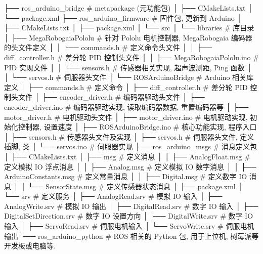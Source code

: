 \documentclass[openany, fontset=windowsold]{ctexbook}
\theoremstyle{kaiti}
\theoremstyle{normal}
\begin{document}
\begin{bash}
  ├── ros_arduino_bridge                      # metapackage (元功能包)
  │   ├── CMakeLists.txt
  │   └── package.xml
  ├── ros_arduino_firmware                    # 固件包, 更新到 Arduino
  │   ├── CMakeLists.txt
  │   ├── package.xml
  │   └── src
  │       └── libraries                       # 库目录
  │           ├── MegaRobogaiaPololu          # 针对 Pololu 电机控制器, MegaRobogaia 编码器的头文件定义
  │           │   ├── commands.h              # 定义命令头文件
  │           │   ├── diff_controller.h       # 差分轮 PID 控制头文件
  │           │   ├── MegaRobogaiaPololu.ino  # PID 实现文件
  │           │   ├── sensors.h               # 传感器相关实现, 超声波测距, Ping 函数
  │           │   └── servos.h                # 伺服器头文件
  │           └── ROSArduinoBridge            # Arduino 相关库定义
  │               ├── commands.h              # 定义命令
  │               ├── diff_controller.h       # 差分轮 PID 控制头文件
  │               ├── encoder_driver.h        # 编码器驱动头文件
  │               ├── encoder_driver.ino      # 编码器驱动实现, 读取编码器数据, 重置编码器等
  │               ├── motor_driver.h          # 电机驱动头文件
  │               ├── motor_driver.ino        # 电机驱动实现, 初始化控制器, 设置速度
  │               ├── ROSArduinoBridge.ino    # 核心功能实现, 程序入口
  │               ├── sensors.h               # 传感器头文件及实现
  │               ├── servos.h                # 伺服器头文件, 定义插脚, 类
  │               └── servos.ino              # 伺服器实现
  ├── ros_arduino_msgs                        # 消息定义包
  │   ├── CMakeLists.txt
  │   ├── msg                                 # 定义消息
  │   │   ├── AnalogFloat.msg                 # 定义模拟 IO 浮点消息
  │   │   ├── Analog.msg                      # 定义模拟 IO 数字消息
  │   │   ├── ArduinoConstants.msg            # 定义常量消息
  │   │   ├── Digital.msg                     # 定义数字 IO 消息
  │   │   └── SensorState.msg                 # 定义传感器状态消息
  │   ├── package.xml
  │   └── srv                                 # 定义服务
  │       ├── AnalogRead.srv                  # 模拟 IO 输入
  │       ├── AnalogWrite.srv                 # 模拟 IO 输出
  │       ├── DigitalRead.srv                 # 数字 IO 输入
  │       ├── DigitalSetDirection.srv         # 数字 IO 设置方向
  │       ├── DigitalWrite.srv                # 数字 IO 输入
  │       ├── ServoRead.srv                   # 伺服电机输入
  │       └── ServoWrite.srv                  # 伺服电机输出
  └── ros_arduino_python                      # ROS 相关的 Python 包, 用于上位机, 树莓派等开发板或电脑等.

\end{bash}
\end{document}
